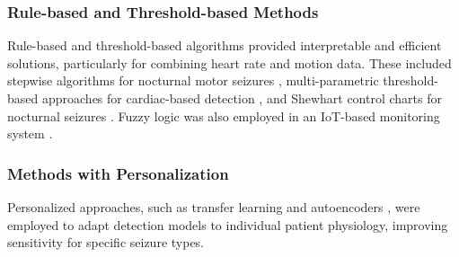 \subsubsection{Rule-based and Threshold-based Methods}
Rule-based and threshold-based algorithms provided interpretable and efficient solutions, particularly for combining heart rate and motion data. These included stepwise algorithms for nocturnal motor seizures \cite{Van_Andel2017-yx}, multi-parametric threshold-based approaches for cardiac-based detection \cite{Hegarty-Craver2021-hk}, and Shewhart control charts for nocturnal seizures \cite{Gheryani2017-yg}. Fuzzy logic was also employed in an IoT-based monitoring system \cite{Hassan2022-do}.

\subsubsection{Methods with Personalization}
Personalized approaches, such as transfer learning \cite{Nasseri2021-xn} and autoencoders \cite{Yu2023-ss}, were employed to adapt detection models to individual patient physiology, improving sensitivity for specific seizure types.